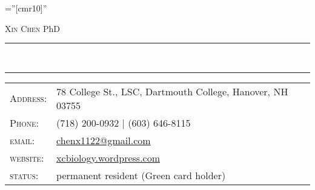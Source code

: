 \documentclass[12pt]{article}
\begin{document}

\pagestyle{empty} %

\font\fb=''[cmr10]'' %

\par{\centering
		{\Huge\textsc{Xin Chen}
	}\normalsize{PhD}\par}
 
 
\noindent\hfil\rule{\textwidth}{.8pt}\hfil \\[-0.80\baselineskip]%
\noindent\hfil\rule{\textwidth}{.8pt}\hfil
\begin{tabular}{lp{12.5cm}}
    \textsc{Address:}   & 78 College St., LSC, Dartmouth College, Hanover, NH 03755 \\
    \textsc{Phone:}     & (718) 200-0932 | (603) 646-8115 \\
    \textsc{email:}     &  \href{mailto:chenx1122@gmail.com}{chenx1122@gmail.com}\\
    \textsc{website:}     &  \href{https://xcbiology.wordpress.com/}{xcbiology.wordpress.com}\\
    \textsc{status:}     & permanent resident (Green card holder)\\
    
\end{tabular}
\\
\\
\\
\end{document}
